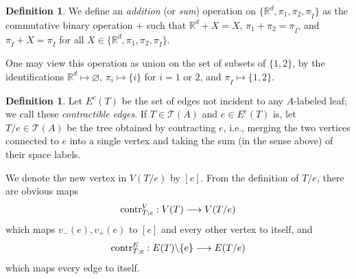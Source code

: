 \documentclass[11pt]{article}
\theoremstyle{definition}
\newtheorem{dfn}[thm]{Definition}
\theoremstyle{remark}
\def\R{\mathbb{R}}
\def\cT{\mathcal{T}}
\def\rI{{\mathring{I}}}
\def\tn#1{\textnormal{#1}}
\begin{document}
\begin{dfn}
We define an {\em addition} (or {\em sum}) operation on $\{\R^d,\pi_1,\pi_2,\pi_\rI\}$ as the commutative binary operation $+$ such that 
$\R^d + X = X$, $\pi_1 + \pi_2 = \pi_\rI$, and $\pi_\rI + X = \pi_\rI$ for all $X \in \{\R^d,\pi_1,\pi_2,\pi_\rI\}$.
\end{dfn}

One may view this operation as union on the set of subsets of $\{1,2\}$, by the identifications $\R^d\mapsto \varnothing$, $\pi_i \mapsto \{i\}$ for $i=1$ or $2$, and $\pi_\rI\mapsto \{1,2\}$.

\begin{dfn}
Let $E^c(T)$ be the set of edges not incident to any $A$-labeled leaf;
we call these {\em contractible edges}.
If $T\in\cT(A)$ and $e \in E^c(T)$ is, let $T/e\in\cT(A)$ be the tree obtained by contracting $e$, i.e., merging the two vertices connected to $e$ into a single vertex and taking 
the sum (in the sense above) of their space labels. 

%

We denote the new vertex in $V(T/e)$ by $[e]$. 
From the definition of $T/e$, there are obvious maps 
$$\tn{contr}^V_{T;e}:V(T)\longrightarrow V(T/e)$$
which maps $v_-(e),v_+(e)$ to $[e]$ and every other vertex to itself, and
$$\tn{contr}^E_{T;e}:E(T)\backslash\{e\}\longrightarrow E(T/e)$$
which maps every edge to itself. 
\end{dfn}
\end{document}
